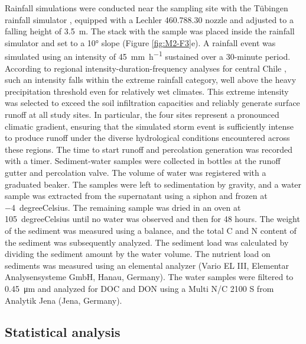 \FloatBarrier

Rainfall simulations were conducted near the sampling site with the Tübingen rainfall simulator \citep{Iserloh2013,Seitz2015}, equipped with a Lechler 460.788.30 nozzle and adjusted to a falling height of \SI{3.5}{\meter}. The stack with the sample was placed inside the rainfall simulator and set to a \ang{10} slope (Figure \ref{fig:M2-F3}e). A rainfall event was simulated using an intensity of \SI{45}{\milli\metre\per\hour} sustained over a 30-minute period. According to regional intensity-duration-frequency analyses for central Chile \citep{PizarroTapia2020}, such an intensity falls within the extreme rainfall category, well above the heavy precipitation threshold even for relatively wet climates. This extreme intensity was selected to exceed the soil infiltration capacities and reliably generate surface runoff at all study sites. In particular, the four sites represent a pronounced climatic gradient, ensuring that the simulated storm event is sufficiently intense to produce runoff under the diverse hydrological conditions encountered across these regions. The time to start runoff and percolation generation was recorded with a timer. Sediment-water samples were collected in bottles at the runoff gutter and percolation valve. The volume of water was registered with a graduated beaker. The samples were left to sedimentation by gravity, and a water sample was extracted from the supernatant using a siphon and frozen at \SI{-4}{degreeCelsius}. The remaining sample was dried in an oven at \SI{105}{degreeCelsius} until no water was observed and then for 48 hours. The weight of the sediment was measured using a balance, and the total C and N content of the sediment was subsequently analyzed. The sediment load was calculated by dividing the sediment amount by the water volume. The nutrient load on sediments was measured using an elemental analyzer (Vario EL III, Elementar Analysensysteme GmbH, Hanau, Germany). The water samples were filtered to \SI{0.45}{\micro\meter} and analyzed for DOC and DON using a Multi N/C 2100 S from Analytik Jena (Jena, Germany).

\subsection{Statistical analysis}

